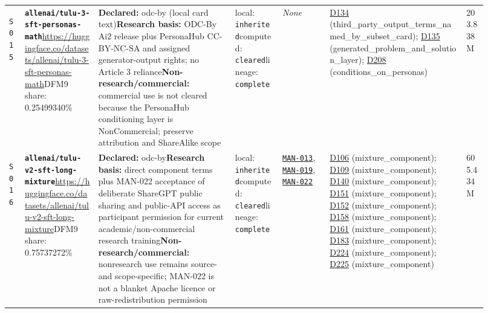 \documentclass[9pt,a4paper]{article}
\newcommand{\srcid}[1]{\hypertarget{src:#1}{\texttt{#1}}}
\begin{document}
\begin{landscape}
\begin{longtable}{@{}L{0.03\linewidth}L{0.14\linewidth}L{0.26\linewidth}L{0.09\linewidth}L{0.09\linewidth}L{0.265\linewidth}L{0.045\linewidth}@{}}
\srcid{S015} & \textbf{\nolinkurl{allenai/tulu-3-sft-personas-math}}\newline \url{https://huggingface.co/datasets/allenai/tulu-3-sft-personas-math}\newline DFM9 share: 0.25499340\% & \textbf{Declared:} odc-by (local card text)\newline \textbf{Research basis:} ODC-By Ai2 release plus PersonaHub CC-BY-NC-SA and assigned generator-output rights; no Article 3 reliance\newline \textbf{Non-research/commercial:} commercial use is not cleared because the PersonaHub conditioning layer is NonCommercial; preserve attribution and ShareAlike scope & local: \texttt{inherited}\newline computed: \texttt{cleared}\newline lineage: \texttt{complete} & \textit{None} & \hyperlink{dep:D134}{D134} (third\_party\_output\_terms\_named\_by\_subset\_card); \hyperlink{dep:D135}{D135} (generated\_problem\_and\_solution\_layer); \hyperlink{dep:D208}{D208} (conditions\_on\_personas) & 203.838M \\
\srcid{S016} & \textbf{\nolinkurl{allenai/tulu-v2-sft-long-mixture}}\newline \url{https://huggingface.co/datasets/allenai/tulu-v2-sft-long-mixture}\newline DFM9 share: 0.75737272\% & \textbf{Declared:} odc-by\newline \textbf{Research basis:} direct component terms plus MAN-022 acceptance of deliberate ShareGPT public sharing and public-API access as participant permission for current academic/non-commercial research training\newline \textbf{Non-research/commercial:} nonresearch use remains source- and scope-specific; MAN-022 is not a blanket Apache licence or raw-redistribution permission & local: \texttt{inherited}\newline computed: \texttt{cleared}\newline lineage: \texttt{complete} & \hyperlink{manual:MAN-013}{\texttt{MAN-013}}, \hyperlink{manual:MAN-019}{\texttt{MAN-019}}, \hyperlink{manual:MAN-022}{\texttt{MAN-022}} & \hyperlink{dep:D106}{D106} (mixture\_component); \hyperlink{dep:D109}{D109} (mixture\_component); \hyperlink{dep:D140}{D140} (mixture\_component); \hyperlink{dep:D151}{D151} (mixture\_component); \hyperlink{dep:D152}{D152} (mixture\_component); \hyperlink{dep:D158}{D158} (mixture\_component); \hyperlink{dep:D161}{D161} (mixture\_component); \hyperlink{dep:D183}{D183} (mixture\_component); \hyperlink{dep:D224}{D224} (mixture\_component); \hyperlink{dep:D225}{D225} (mixture\_component) & 605.434M \\

\end{longtable}
\end{landscape}
\end{document}
